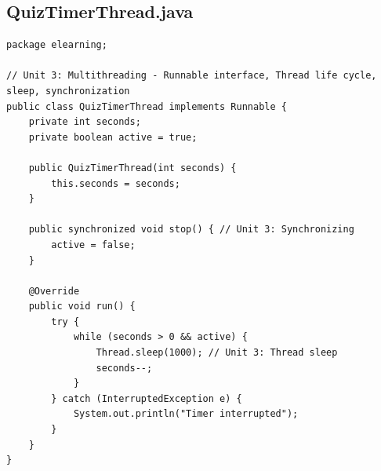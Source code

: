 \documentclass[12pt,a4paper]{article}
\begin{document}
\subsection{QuizTimerThread.java}
\begin{lstlisting}
package elearning;

// Unit 3: Multithreading - Runnable interface, Thread life cycle, sleep, synchronization
public class QuizTimerThread implements Runnable {
    private int seconds;
    private boolean active = true;

    public QuizTimerThread(int seconds) {
        this.seconds = seconds;
    }

    public synchronized void stop() { // Unit 3: Synchronizing
        active = false;
    }

    @Override
    public void run() {
        try {
            while (seconds > 0 && active) {
                Thread.sleep(1000); // Unit 3: Thread sleep
                seconds--;
            }
        } catch (InterruptedException e) {
            System.out.println("Timer interrupted");
        }
    }
}
\end{lstlisting}
\end{document}
